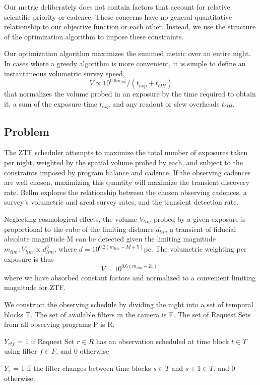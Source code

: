 \documentclass{article}
\begin{document}
Our metric deliberately does not contain factors that account
for relative scientific priority or cadence. These concerns have
no general quantitative relationship to our objective function or
each other. Instead, we use the structure of the optimization
algorithm to impose these constraints.

Our optimization algorithm maximizes the
summed metric over an entire night. In cases where a greedy
algorithm is more convenient, it is simple to define an
instantaneous volumetric survey speed, \[V \propto 10^{0.6m_{lim}}/(t_{exp}+t_{OH})\]
that normalizes the volume probed in an exposure by the time
required to obtain it, a sum of the exposure time \(t_{exp}\) and any
readout or slew overheads \(t_{OH}\).

\subsection*{Problem}

The ZTF scheduler attempts to maximize the total
number of exposures taken per night, weighted by the spatial
volume probed by each, and subject to the constraints imposed by
program balance and cadence. If the observing
cadences are well chosen, maximizing this quantity will maximize
the transient discovery rate. Bellm explores the relationship
between the chosen observing cadences, a survey’s volumetric
and areal survey rates, and the transient detection rate.

Neglecting cosmological effects, the volume \(V_{lim}\) probed by
a given exposure is proportional to the cube of the limiting
distance \(d_{lim}\) a transient of fiducial absolute magnitude M can
be detected given the limiting magnitude \(m_{lim}: V_{lim} \propto d_{lim}^3\),
where \(d = 10^{0.2(m_{lim}-M+5)}\)pc. The volumetric
weighting per exposure is thus \[V = 10^{0.6(m_{lim} - 21)},\]
where we have absorbed constant factors and normalized to a
convenient limiting magnitude for ZTF.

We construct the observing schedule by dividing the night
into a set of temporal blocks T. The set of available filters in the camera is F. The set of
Request Sets from all observing programs P is R.

\(Y_{rtf}\) = 1 if Request Set \(r \in R\) has an observation scheduled
at time block \(t \in T\) using filter \(f \in F\), and 0 otherwise

\(Y_s\) = 1 if the filter changes between time blocks \(s \in T\)
and \(s + 1 \in T\), and 0 otherwise.
\end{document}

